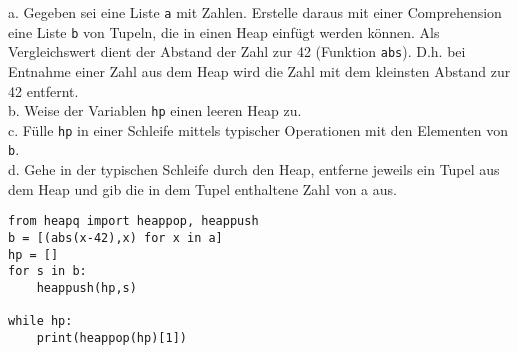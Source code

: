 \question[4]
a. Gegeben sei eine Liste \texttt{a} mit Zahlen.
Erstelle daraus mit einer Comprehension eine Liste \texttt{b} von Tupeln,
die in einen Heap einfügt werden können. Als Vergleichswert dient der Abstand
der Zahl zur 42 (Funktion \texttt{abs}). D.h. bei Entnahme einer Zahl aus dem Heap
wird die Zahl mit dem kleinsten Abstand zur 42 entfernt. \\
b. Weise der Variablen \texttt{hp} einen leeren Heap zu. \\
c. Fülle \texttt{hp} in einer Schleife mittels typischer Operationen mit den Elementen von
\texttt{b}. \\
d. Gehe in der typischen Schleife durch den Heap, entferne jeweils ein Tupel aus dem Heap
und gib die in dem Tupel enthaltene Zahl von a aus.

\begin{solutionbox}{5cm}
\begin{lstlisting}
from heapq import heappop, heappush
b = [(abs(x-42),x) for x in a]
hp = []
for s in b:
    heappush(hp,s)

while hp:
    print(heappop(hp)[1])
\end{lstlisting}
\end{solutionbox}
